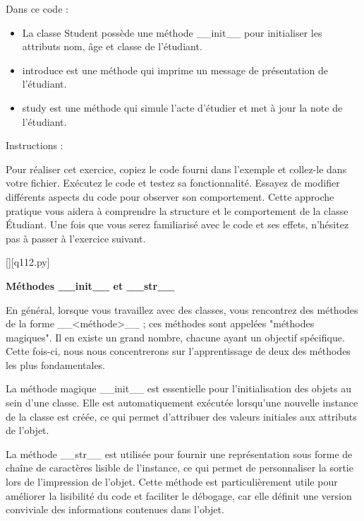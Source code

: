 		Dans ce code :
		
    \begin{itemize}
    \item La classe Student possède une méthode \_\_init\_\_ pour initialiser les attributs nom, âge et classe de l'étudiant.
    \item introduce est une méthode qui imprime un message de présentation de l'étudiant.
    \item study est une méthode qui simule l'acte d'étudier et met à jour la note de l'étudiant.
    \end{itemize}
		
		Instructions :
		
    Pour réaliser cet exercice, copiez le code fourni dans l'exemple et collez-le dans votre fichier. Exécutez le code et testez sa fonctionnalité. Essayez de modifier différents aspects du code pour observer son comportement. Cette approche pratique vous aidera à comprendre la structure et le comportement de la classe Étudiant. Une fois que vous serez familiarisé avec le code et ses effets, n'hésitez pas à passer à l'exercice suivant.
		\par
		\renewcommand{\nomfichier}{q112.py}
		\begin{solution}
		    \pythonfile{\chemincode \nomfichier}[][\nomfichier]
		\end{solution}
        
        \question
		\textbf{Méthodes \_\_init\_\_ et \_\_str\_\_}
		
		En général, lorsque vous travaillez avec des classes, vous rencontrez des méthodes de la forme \_\_<méthode>\_\_ ; ces méthodes sont appelées "méthodes magiques". Il en existe un grand nombre, chacune ayant un objectif spécifique. Cette fois-ci, nous nous concentrerons sur l'apprentissage de deux des méthodes les plus fondamentales.
		
		La méthode magique \_\_init\_\_ est essentielle pour l'initialisation des objets au sein d'une classe. Elle est automatiquement exécutée lorsqu'une nouvelle instance de la classe est créée, ce qui permet d'attribuer des valeurs initiales aux attributs de l'objet.
		
		La méthode \_\_str\_\_ est utilisée pour fournir une représentation sous forme de chaîne de caractères lisible de l'instance, ce qui permet de personnaliser la sortie lors de l'impression de l'objet. Cette méthode est particulièrement utile pour améliorer la lisibilité du code et faciliter le débogage, car elle définit une version conviviale des informations contenues dans l'objet.
		
